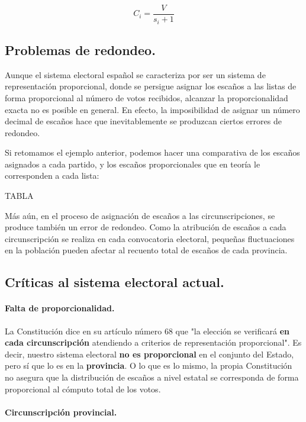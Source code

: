 \documentclass[11pt]{article}
\begin{document}
	$$C_i = \dfrac{V}{s_i + 1}$$
	
	
	
	\subsection{Problemas de redondeo.}
	
	Aunque el sistema electoral español se caracteriza por ser un sistema de representación proporcional, donde se persigue asignar los escaños a las listas de forma proporcional al número de votos recibidos, alcanzar la proporcionalidad exacta no es posible en general. En efecto, la imposibilidad de asignar un número decimal de escaños hace que inevitablemente se produzcan ciertos errores de redondeo.
	
	 Si retomamos el ejemplo anterior, podemos hacer una comparativa de los escaños asignados a cada partido, y los escaños proporcionales que en teoría le corresponden a cada lista:
	 
	 TABLA
	 
	 Más aún, en el proceso de asignación de escaños a las circunscripciones, se produce también un error de redondeo. Como la atribución de escaños a cada circunscripción se realiza en cada convocatoria electoral, pequeñas fluctuaciones en la población pueden afectar al recuento total de escaños de cada provincia.
	
	\subsection{Críticas al sistema electoral actual.}
	
	\paragraph{Falta de proporcionalidad.}
	
	La Constitución dice en su artículo número 68 que "la elección se verificará \textbf{en cada circunscripción} atendiendo a criterios de representación proporcional". Es decir, nuestro sistema electoral \textbf{no es proporcional} en el conjunto del Estado, pero sí que lo es en la \textbf{provincia}. O lo que es lo mismo, la propia Constitución no asegura que la distribución de escaños a nivel estatal se corresponda de forma proporcional al cómputo total de los votos.
	
	\paragraph{Circunscripción provincial.}
	
\end{document}
